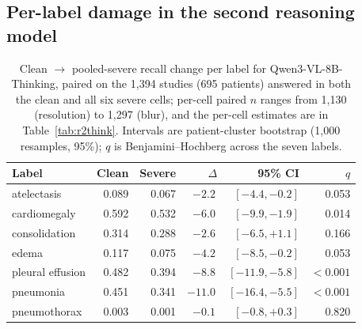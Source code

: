 \subsection*{Per-label damage in the second reasoning model}

\begin{table}[H]
\centering
\small
\caption{Clean $\rightarrow$ pooled-severe recall change per label for Qwen3-VL-8B-Thinking, paired on the 1,394 studies (695 patients) answered in both the clean and all six severe cells; per-cell paired $n$ ranges from 1,130 (resolution) to 1,297 (blur), and the per-cell estimates are in Table~\ref{tab:r2think}. Intervals are patient-cluster bootstrap (1,000 resamples, 95\%); $q$ is Benjamini--Hochberg across the seven labels.}
\label{tab:r2label}
\begin{tabular}{lrrrrr}
\toprule
Label & Clean & Severe & $\Delta$ & 95\% CI & $q$ \\
\midrule
atelectasis & 0.089 & 0.067 & $-2.2$\,\pp{} & $[-4.4,-0.2]$ & 0.053 \\
cardiomegaly & 0.592 & 0.532 & $-6.0$\,\pp{} & $[-9.9,-1.9]$ & 0.014 \\
consolidation & 0.314 & 0.288 & $-2.6$\,\pp{} & $[-6.5,+1.1]$ & 0.166 \\
edema & 0.117 & 0.075 & $-4.2$\,\pp{} & $[-8.5,-0.2]$ & 0.053 \\
pleural effusion & 0.482 & 0.394 & $\mathbf{-8.8}$\,\pp{} & $[-11.9,-5.8]$ & $<0.001$ \\
pneumonia & 0.451 & 0.341 & $\mathbf{-11.0}$\,\pp{} & $[-16.4,-5.5]$ & $<0.001$ \\
pneumothorax & 0.003 & 0.001 & $-0.1$\,\pp{} & $[-0.8,+0.3]$ & 0.820 \\
\bottomrule
\end{tabular}
\end{table}
